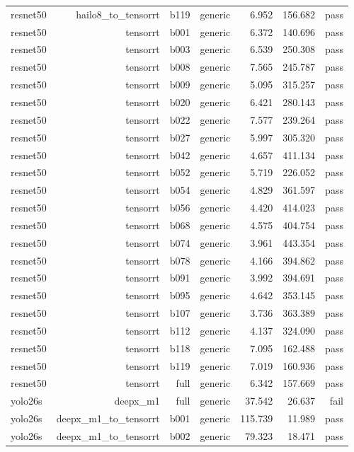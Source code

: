\begin{table}[t]
\begin{tabular}{lrrrrrr}
resnet50 & hailo8\_to\_tensorrt & b119 & generic & 6.952 & 156.682 & pass \\
resnet50 & tensorrt & b001 & generic & 6.372 & 140.696 & pass \\
resnet50 & tensorrt & b003 & generic & 6.539 & 250.308 & pass \\
resnet50 & tensorrt & b008 & generic & 7.565 & 245.787 & pass \\
resnet50 & tensorrt & b009 & generic & 5.095 & 315.257 & pass \\
resnet50 & tensorrt & b020 & generic & 6.421 & 280.143 & pass \\
resnet50 & tensorrt & b022 & generic & 7.577 & 239.264 & pass \\
resnet50 & tensorrt & b027 & generic & 5.997 & 305.320 & pass \\
resnet50 & tensorrt & b042 & generic & 4.657 & 411.134 & pass \\
resnet50 & tensorrt & b052 & generic & 5.719 & 226.052 & pass \\
resnet50 & tensorrt & b054 & generic & 4.829 & 361.597 & pass \\
resnet50 & tensorrt & b056 & generic & 4.420 & 414.023 & pass \\
resnet50 & tensorrt & b068 & generic & 4.575 & 404.754 & pass \\
resnet50 & tensorrt & b074 & generic & 3.961 & 443.354 & pass \\
resnet50 & tensorrt & b078 & generic & 4.166 & 394.862 & pass \\
resnet50 & tensorrt & b091 & generic & 3.992 & 394.691 & pass \\
resnet50 & tensorrt & b095 & generic & 4.642 & 353.145 & pass \\
resnet50 & tensorrt & b107 & generic & 3.736 & 363.389 & pass \\
resnet50 & tensorrt & b112 & generic & 4.137 & 324.090 & pass \\
resnet50 & tensorrt & b118 & generic & 7.095 & 162.488 & pass \\
resnet50 & tensorrt & b119 & generic & 7.019 & 160.936 & pass \\
resnet50 & tensorrt & full & generic & 6.342 & 157.669 & pass \\
yolo26s & deepx\_m1 & full & generic & 37.542 & 26.637 & fail \\
yolo26s & deepx\_m1\_to\_tensorrt & b001 & generic & 115.739 & 11.989 & pass \\
yolo26s & deepx\_m1\_to\_tensorrt & b002 & generic & 79.323 & 18.471 & pass \\

\end{tabular}
\end{table}
